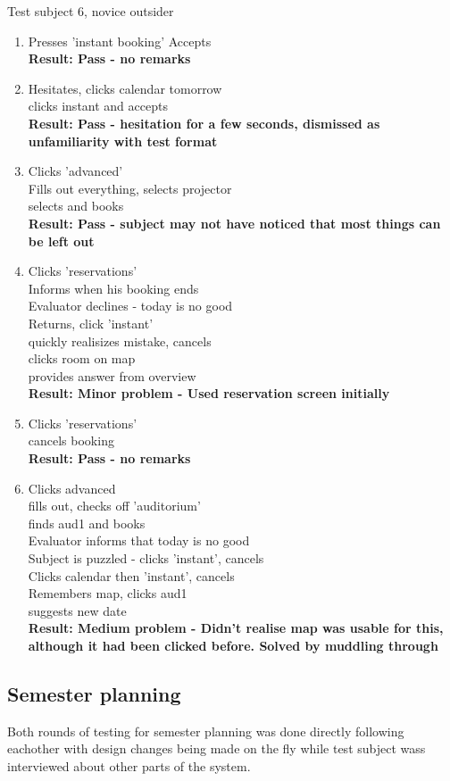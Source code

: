 Test subject 6, novice outsider
\begin{enumerate}
\item Presses 'instant booking'
Accepts \\
\textbf{Result: Pass - no remarks}
\item Hesitates, clicks calendar tomorrow \\
clicks instant and accepts \\
\textbf{Result: Pass - hesitation for a few seconds, dismissed as unfamiliarity with test format}
\item Clicks 'advanced' \\
Fills out everything, selects projector \\
selects and books \\
\textbf{Result: Pass - subject may not have noticed that most things can be left out}
\item Clicks 'reservations' \\
Informs when his booking ends \\
Evaluator declines - today is no good \\
Returns, click 'instant' \\
quickly realisizes mistake, cancels \\
clicks room on map \\
provides answer from overview \\
\textbf{Result: Minor problem - Used reservation screen initially}
\item Clicks 'reservations' \\
cancels booking \\
\textbf{Result: Pass - no remarks}
\item Clicks advanced \\
fills out, checks off 'auditorium' \\
finds aud1 and books \\
Evaluator informs that today is no good \\
Subject is puzzled - clicks 'instant', cancels \\
Clicks calendar then 'instant', cancels \\
Remembers map, clicks aud1 \\
suggests new date \\
\textbf{Result: Medium problem - Didn't realise map was usable for this, although it had been clicked before. Solved by muddling through}
\end{enumerate}

\subsection{Semester planning}
Both rounds of testing for semester planning was done directly following eachother with design changes being made on the fly while test subject wass interviewed about other parts of the system.
\begingroup
\obeylines

\endgroup

